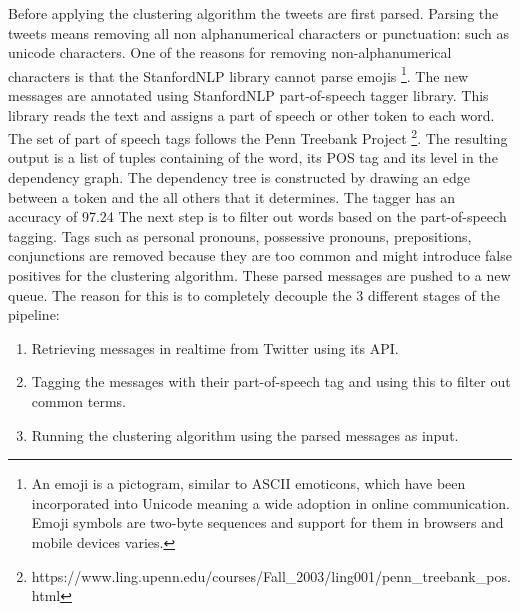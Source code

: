 \newline
Before applying the clustering algorithm the tweets are first parsed. Parsing the tweets means removing all non alphanumerical characters or punctuation: such as unicode characters. One of the reasons for removing non-alphanumerical characters is that the StanfordNLP library cannot parse emojis \footnote{An emoji is a pictogram, similar to ASCII emoticons, which have been incorporated into Unicode meaning a wide adoption in online communication. Emoji symbols are two-byte sequences and support for them in browsers and mobile devices varies.}.
\newline
The new messages are annotated using StanfordNLP part-of-speech tagger library. This library reads the text and assigns a part of speech or other token to each word. The set of part of speech tags follows the Penn Treebank Project \footnote{https://www.ling.upenn.edu/courses/Fall_2003/ling001/penn_treebank_pos.html}. The resulting output is a list of tuples containing of the word, its POS tag and its level in the dependency graph. The dependency tree is constructed by drawing an edge between a token and the all others that it determines. The tagger has an accuracy of 97.24%
\newline
The next step is to filter out words based on the part-of-speech tagging. Tags such as personal pronouns, possessive pronouns, prepositions, conjunctions are removed because they are too common and might introduce false positives for the clustering algorithm.
\newline
These parsed messages are pushed to a new queue. The reason for this is to completely decouple the 3 different stages of the pipeline: 
\begin{enumerate}
	\item Retrieving messages in realtime from Twitter using its API.
	\item Tagging the messages with their part-of-speech tag and using this to filter out common terms.
	\item Running the clustering algorithm using the parsed messages as input.
\end{enumerate}


